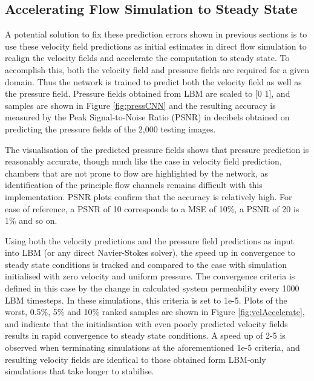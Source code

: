 \documentclass{article}
\begin{document}
\subsection{Accelerating Flow Simulation to Steady State}
\label{sec:acc2D}
A potential solution to fix these prediction errors shown in previous sections is to use these velocity field predictions as initial estimates in direct flow simulation to realign the velocity fields and accelerate the computation to steady state. To accomplish this, both the velocity field and pressure fields are required for a given domain. Thus the network is trained to predict both the velocity field as well as the pressure field. Pressure fields obtained from LBM are scaled to [0 1], and samples are shown in Figure \ref{fig:pressCNN} and the resulting accuracy is measured by the Peak Signal-to-Noise Ratio (PSNR) in decibels obtained on predicting the pressure fields of the 2,000 testing images. 


The visualisation of the predicted pressure fields shows that pressure prediction is reasonably accurate, though much like the case in velocity field prediction, chambers that are not prone to flow are highlighted by the network, as identification of the principle flow channels remains difficult with this implementation. PSNR plots confirm that the accuracy is relatively high. For ease of reference, a PSNR of 10 corresponds to a MSE of 10\%, a PSNR of 20 is 1\% and so on. 

Using both the velocity predictions and the pressure field predictions as input into LBM (or any direct Navier-Stokes solver), the speed up in convergence to steady state conditions is tracked and compared to the case with simulation initialised with zero velocity and uniform pressure. The convergence criteria is defined in this case by the change in calculated system permeability every 1000 LBM timesteps. In these simulations, this criteria is set to 1e-5. Plots of the worst, 0.5\%, 5\% and 10\% ranked samples are shown in Figure \ref{fig:velAccelerate}, and indicate that the initialisation with even poorly predicted velocity fields results in rapid convergence to steady state conditions. A speed up of 2-5 is observed when terminating simulations at the aforementioned 1e-5 criteria, and resulting velocity fields are identical to those obtained form LBM-only simulations that take longer to stabilise.
\end{document}
